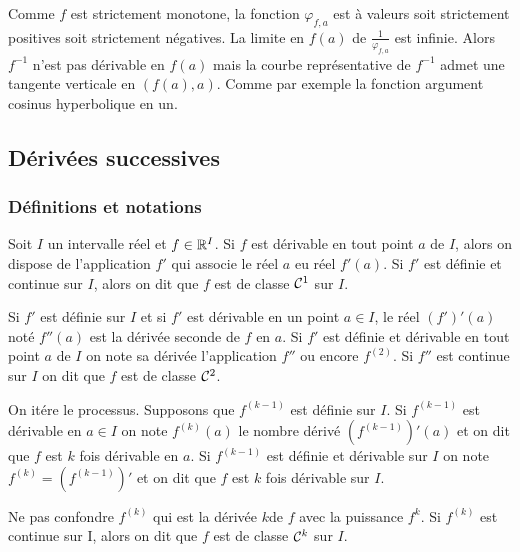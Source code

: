 Comme \(f\) est strictement monotone, la fonction \(\varphi_{f,a}\) est à valeurs soit strictement positives soit strictement négatives. La limite en \(f(a)\) de \(\frac{1}{\varphi_{f,a}}\) est infinie. Alors \(f^{-1}\) n'est pas dérivable en \(f(a)\) mais la courbe représentative de \(f^{-1}\) admet une tangente verticale en \((f(a),a)\). Comme par exemple la fonction argument cosinus hyperbolique en un.

\subsection{Dérivées successives}

\subsubsection{Définitions et notations}

Soit \(I\) un intervalle réel et \(f \in \mathbb{R}^I\). Si \(f\) est dérivable en tout point \(a\) de \(I\), alors on dispose de l'application \(f'\) qui associe le réel \(a\) eu réel \(f'(a)\). Si \(f'\) est définie et continue sur \(I\), alors on dit que \(f\) est de classe \(\mathcal{C}^{1}\) sur \(I\).

Si \(f'\) est définie sur \(I\) et si \(f'\) est dérivable en un point \(a \in I\), le réel \((f')'(a)\) noté \(f''(a)\) est la dérivée seconde de \(f\) en \(a\). Si \(f'\) est définie et dérivable en tout point \(a\) de \(I\) on note sa dérivée l'application \(f''\) ou encore \(f^{(2)}\). Si \(f''\) est continue sur \(I\) on dit que \(f\) est de classe \(\mathcal{C}^{2}\).

On itére le processus. Supposons que \(f^{(k-1)}\) est définie sur \(I\). Si \(f^{(k-1)}\) est dérivable en \(a \in I\) on note \(f^{(k)}(a)\) le nombre dérivé \((f^{(k-1)})'(a)\) et on dit que \(f\) est \(k\) fois dérivable en \(a\). Si \(f^{(k-1)}\) est définie et dérivable sur \(I\) on note \(f^{(k)} = (f^{(k-1)})'\) et on dit que \(f\) est \(k\) fois dérivable sur \(I\).

Ne pas confondre \(f^{(k)}\) qui est la dérivée \(k\)\ieme de \(f\) avec la puissance \(f^k\). Si \(f^{(k)}\) est continue sur I, alors on dit que \(f\) est de classe \(\mathcal{C}^{k}\) sur \(I\).

